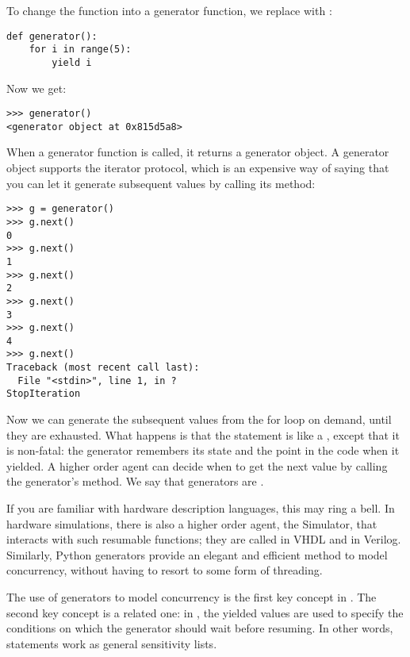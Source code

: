 To change the function into a generator function, we replace
 with :

\begin{verbatim}
def generator():
    for i in range(5):
        yield i
\end{verbatim}

Now we get:

\begin{verbatim}
>>> generator()
<generator object at 0x815d5a8>
\end{verbatim}

When a generator function is called, it returns a generator object. A
generator object supports the iterator protocol, which is an expensive
way of saying that you can let it generate subsequent values by
calling its  method:

\begin{verbatim}
>>> g = generator()
>>> g.next()
0
>>> g.next()
1
>>> g.next()
2
>>> g.next()
3
>>> g.next()
4
>>> g.next()
Traceback (most recent call last):
  File "<stdin>", line 1, in ?
StopIteration
\end{verbatim}

Now we can generate the subsequent values from the for loop on demand,
until they are exhausted. What happens is that the
 statement is like a
, except that it is non-fatal: the generator remembers
its state and the point in the code when it yielded. A higher order
agent can decide when to get the next value by calling the
generator's  method. We say that generators are
.

If you are familiar with hardware description languages, this may ring
a bell. In hardware simulations, there is also a higher order agent,
the Simulator, that interacts with such resumable functions; they are
called 
%
 in VHDL and 
%
 in
Verilog.  Similarly, Python generators provide an elegant
and efficient method to model concurrency, without having to resort to
some form of threading.

The use of generators to model concurrency is the first key concept in
\myhdl{}. The second key concept is a related one: in \myhdl{}, the
yielded values are used to specify the conditions on which the
generator should wait before resuming. In other words, 
statements work as general 
sensitivity lists. 

